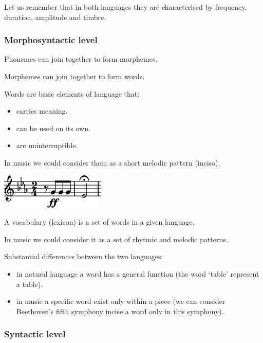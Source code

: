 Let us remember that in both languages they are characterised by frequency, duration, amplitude and timbre.

\subsubsection{Morphosyntactic level }\label{morphosyntactic-level}

Phonemes can join together to form morphemes.

Morphemes can join together to form words.

Words are basic elements of language that: 

\begin{itemize}
\tightlist
\item carries meaning. 
\item can be used on its own.
\item are uninterruptible.
\end{itemize}

In music we could consider them as a short melodic pattern (inciso).

\begin{center}
\includegraphics[scale=0.7]{../img/inci.png}
\end{center}

A vocabulary (lexicon) is a set of words in a given language.

In music we could consider it as a set of rhytmic and melodic patterns.

Substantial differences between the two languages:

\begin{itemize}
\tightlist
\item in natural language a word has a general function (the word `table' represent a table).
\item in music a specific word exist only within a piece (we can consider Beethoven's fifth symphony incise a word only in this symphony).
\end{itemize}

\subsubsection{Syntactic level }\label{syntactic-level}

